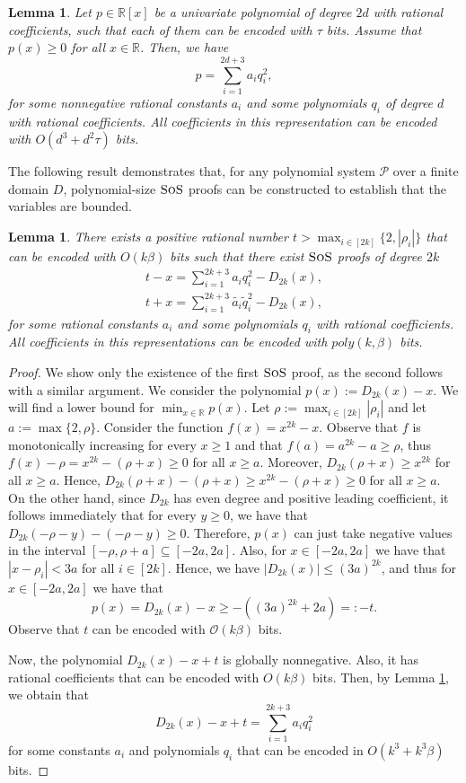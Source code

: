 \documentclass[11pt]{article}
\newcommand{\sos}{\text{\sc{SoS}}}
\newcommand{\1}{\textbf{1}}
\newtheorem{lemma}[theorem]{Lemma}
\begin{document}
\begin{lemma}\label{lemma-rational-sq}\cite[Section 4, Thm 23]{magron-schwei}
    Let $p\in \mathbb{R}[x]$ be a univariate polynomial of degree $2d$ with rational coefficients, such that each of them can be encoded with $\tau$ bits. Assume that $p(x)\geq 0$ for all $x\in \mathbb{R}$. Then, we have 
    $$p=\sum_{i=1}^{2d+3}a_iq_i^2,$$
    for some nonnegative rational constants $a_i$ and some polynomials $q_i$ of degree $d$ with rational coefficients. All coefficients in this representation can be encoded with ${O}(d^3 +d^2\tau)$ bits.
\end{lemma}
The following result demonstrates that, for any polynomial system \(\mathcal{P}\) over a finite domain \(D\), polynomial-size \(\sos\) proofs can be constructed to establish that the variables are bounded.
\begin{lemma}\label{lemma-new-t}
    There exists a positive rational number $t>\max_{i\in [2k]}\{2,|\rho_i|\}$ that can be encoded with ${O}(k\beta)$ bits such that there exist $\sos$ proofs of degree $2k$
    \begin{align}
        t-x = \sum_{i=1}^{2k+3}a_iq_i^2 - D_{2k}(x), \\
        t+x = \sum_{i=1}^{2k+3}\tilde{a_i}\tilde{q}_i^2 - D_{2k}(x),
    \end{align}
 for some rational constants $a_i$ and some polynomials $q_i$ with rational coefficients. All coefficients in this representations can be encoded with $poly(k,\beta)$ bits.
\end{lemma}
\begin{proof}
    We show only the existence of the first $\sos$ proof, as the second follows with a similar argument. We consider the polynomial $p(x):= D_{2k}(x)-x$. We will find a lower bound for $\min_{x\in \mathbb{R}} p(x)$. Let $\rho := \max_{i\in [2k]}|\rho_i|$ and let $a := \max\{2, \rho\}$. Consider the function $f(x) = x^{2k} - x$. Observe that $f$ is monotonically increasing for every $x \geq 1$ and that $f(a) = a^{2k} - a \geq \rho$, thus $f(x) - \rho = x^{2k} - (\rho + x) \geq 0$ for all $x \geq a$. Moreover, $D_{2k}(\rho + x) \geq x^{2k}$ for all $x \geq a$. Hence, $D_{2k}(\rho + x)-(\rho+x) \geq x^{2k} - (\rho+x) \geq 0$ for all $x\geq a$. On the other hand, since $D_{2k}$ has even degree and positive leading coefficient, it follows immediately that for every $y \geq 0$, we have that $D_{2k}(-\rho-y)-(-\rho-y)\geq 0$. Therefore, $p(x)$ can just take negative values in the interval $[-\rho,\rho+a] \subseteq [-2a, 2a]$. Also, for $x\in [-2a,2a]$ we have that $|x-\rho_i|<3a$ for all $i\in[2k]$. Hence, we have $|D_{2k}(x)|\leq (3a)^{2k}$, and thus for $x\in [-2a,2a]$ we have that
    $$p(x)= D_{2k}(x)- x \geq -((3a)^{2k}+2a)=:-t.$$
    Observe that $t$ can be encoded with $\mathcal{O}(k\beta)$ bits.

    Now, the polynomial $D_{2k}(x)-x+t$ is globally nonnegative. Also, it has rational coefficients that can be encoded with $O(k\beta)$ bits. Then, by Lemma \ref{lemma-rational-sq}, we obtain that 
    $$D_{2k}(x)-x+t = \sum_{i=1}^{2k+3}a_iq_i^2 $$
    for some constants $a_i$ and polynomials $q_i$ that can be encoded in $O(k^3 + k^3\beta)$ bits.
\end{proof}
\end{document}
